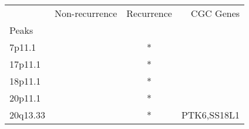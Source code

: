 \begin{tabular}{lccr}
\toprule
{} & Non-recurrence & Recurrence &    CGC Genes \\
Peaks    &                &            &              \\
\midrule
7p11.1   &                &          * &              \\
17p11.1  &                &          * &              \\
18p11.1  &                &          * &              \\
20p11.1  &                &          * &              \\
20q13.33 &                &          * &  PTK6,SS18L1 \\
\bottomrule
\end{tabular}
